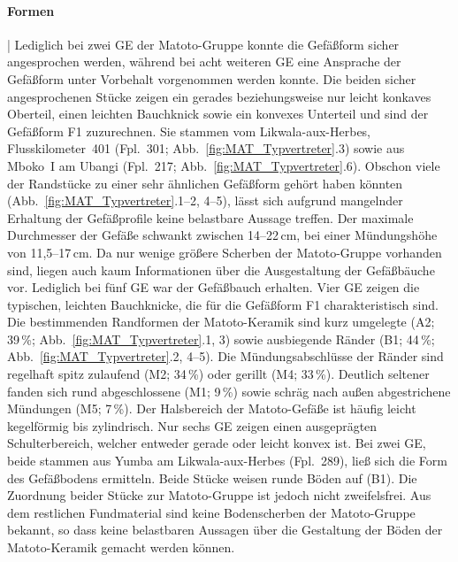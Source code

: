\paragraph{Formen}\hspace{-.5em}|\hspace{.5em}%
Lediglich bei zwei GE der Matoto-Gruppe konnte die Gefäßform sicher angesprochen werden, während bei acht weiteren GE eine Ansprache der Gefäßform unter Vorbehalt vorgenommen werden konnte. Die beiden sicher angesprochenen Stücke zeigen ein gerades beziehungsweise nur leicht konkaves Oberteil, einen leichten Bauchknick sowie ein konvexes Unterteil und sind der Gefäßform F1 zuzurechnen. Sie stammen vom Likwala-aux-Herbes, Flusskilometer~401 (Fpl.~301; Abb.~\ref{fig:MAT_Typvertreter}.3) sowie aus Mboko~I am \mbox{Ubangi} (Fpl.~217; Abb.~\ref{fig:MAT_Typvertreter}.6). Obschon viele der Randstücke zu einer sehr ähnlichen Gefäßform gehört haben könnten (Abb.~\ref{fig:MAT_Typvertreter}.1--2, 4--5), lässt sich aufgrund mangelnder Erhaltung der Gefäßprofile keine belastbare Aussage treffen. Der maximale Durchmesser der Gefäße schwankt zwischen 14--22\,cm, bei einer Mündungshöhe von 11,5--17\,cm.  Da nur wenige größere Scherben der Matoto-Gruppe vorhanden sind, liegen auch kaum Informationen über die Ausgestaltung der Gefäßbäuche vor. Lediglich bei fünf GE war der Gefäßbauch erhalten. Vier GE zeigen die typischen, leichten Bauchknicke, die für die Gefäßform F1 charakteristisch sind. Die bestimmenden Randformen der Matoto-Keramik sind kurz umgelegte (A2; 39\,\%; Abb.~\ref{fig:MAT_Typvertreter}.1, 3) sowie ausbiegende Ränder (B1; 44\,\%; Abb.~\ref{fig:MAT_Typvertreter}.2, 4--5). Die Mündungsabschlüsse der Ränder sind regelhaft spitz zulaufend (M2; 34\,\%) oder gerillt (M4; 33\,\%). Deutlich seltener fanden sich rund abgeschlossene (M1; 9\,\%) sowie schräg nach außen abgestrichene Mündungen (M5; 7\,\%). Der Halsbereich der Matoto-Gefäße ist häufig leicht kegelförmig bis zylindrisch. Nur sechs GE zeigen einen ausgeprägten Schulterbereich, welcher entweder gerade oder leicht konvex ist. Bei zwei GE, beide stammen aus Yumba am \mbox{Likwala}-\mbox{aux}-\mbox{Herbes} (Fpl.~289), ließ sich die Form des Gefäßbodens ermitteln. Beide Stücke weisen runde Böden auf (B1). Die Zuordnung beider Stücke zur Matoto-Gruppe ist jedoch nicht zweifelsfrei. Aus dem restlichen Fundmaterial sind keine Bodenscherben der Matoto-Gruppe bekannt, so dass keine belastbaren Aussagen über die Gestaltung der Böden der Matoto-Keramik gemacht werden können.

